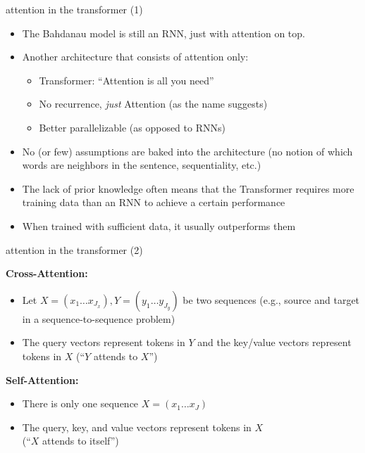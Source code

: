 \documentclass[11pt,compress,t,notes=noshow, xcolor=table]{beamer}
\begin{document}
\begin{frame}{attention in the transformer (1)}

\vfill

\begin{itemize}
	\item The Bahdanau model is still an RNN, just with attention on top.
	\item Another architecture that consists of attention only: 
		\begin{itemize}
			\item Transformer: ``Attention is all you need'' 
			\item No recurrence, \textit{just} Attention (as the name suggests)
			\item Better parallelizable (as opposed to RNNs)
		\end{itemize}
	\item No (or few) assumptions are baked into the architecture (no notion of which words are neighbors in the sentence, sequentiality, etc.)
	\item The lack of prior knowledge often means that the Transformer requires more training data than an RNN to achieve a certain performance
	\item When trained with sufficient data, it usually outperforms them
\end{itemize}

\vfill

\end{frame}


\begin{frame}{attention in the transformer (2)}

\vfill

\textbf{Cross-Attention:}
    \begin{itemize}
        \item Let $X = (x_1 \ldots x_{J_x}), Y = (y_1 \ldots y_{J_y})$ be two sequences (e.g., source and target in a sequence-to-sequence problem)
        \item The query vectors represent tokens in $Y$ and the key/value vectors represent tokens in $X$ (``$Y$ attends to $X$'')
    \end{itemize}

\medskip\medskip

\textbf{Self-Attention:}
    \begin{itemize}
        \item There is only one sequence $X = (x_1 \ldots x_J)$
        \item The query, key, and value vectors represent tokens in $X$\\
        (``$X$ attends to itself'')
    \end{itemize}

\vfill

\end{frame}
\end{document}
